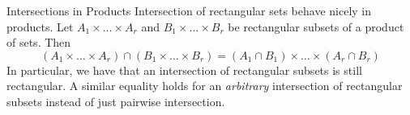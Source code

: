 \begin{remarkBox}{Intersections in Products}
    Intersection of rectangular sets behave nicely in products.
    Let \( A_{ 1 } \times \ldots \times A_{ r } \) and 
    \( B_{ 1 } \times \ldots \times B_{ r } \) be rectangular subsets of a 
    product of sets.
    Then
    \begin{equation*}
        ( A_{ 1 } \times \ldots \times A_{ r } ) 
        \cap 
        ( B_{ 1 } \times \ldots \times B_{ r } )
        =
        ( A_{ 1 } \cap B_{ 1 } ) \times \ldots \times ( A_{ r } \cap B_{ r } )
    \end{equation*}
    In particular, we have that an intersection of rectangular subsets is still
    rectangular.
    A similar equality holds for an \textit{arbitrary} intersection of
    rectangular subsets instead of just pairwise intersection.
\end{remarkBox}


